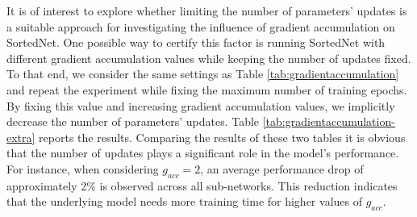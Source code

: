 \documentclass[letterpaper]{article} %
\begin{document}
It is of interest to explore whether limiting the number of parameters' updates is a suitable approach for investigating the influence of gradient accumulation on SortedNet. One possible way to certify this factor is running SortedNet with different gradient accumulation values while keeping the number of updates fixed. To that end, we consider the same settings as Table \ref{tab:gradientaccumulation} and repeat the experiment while fixing the maximum number of training epochs. By fixing this value and increasing gradient accumulation values, we implicitly decrease the number of parameters' updates. Table \ref{tab:gradientaccumulation-extra} reports the results. Comparing the results of these two tables it is obvious that the number of updates plays a significant role in the model's performance. For instance, when considering $g_{acc}=2$, an average performance drop of approximately 2\% is observed  across all sub-networks. This reduction indicates  that the underlying model needs more training time for higher values of $g_{acc}$.
\end{document}
